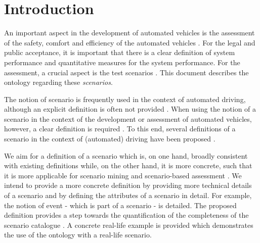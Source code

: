\section{Introduction}
\label{sec:introduction}

An important aspect in the development of automated vehicles is the assessment of the safety, comfort and efficiency of the automated vehicles \cite{bengler2014threedecades, stellet2015taxonomy, Helmer2017safety, putz2017pegasus, roesener2017comprehensive, gietelink2006development}. For the legal and public acceptance, it is important that there is a clear definition of system performance and quantitative measures for the system performance. For the assessment, a crucial aspect is the test scenarios \cite{stellet2015taxonomy}. This document describes the ontology regarding these \emph{scenarios}.

The notion of scenario is frequently used in the context of automated driving, although an explicit definition is often not provided \cite{putz2017pegasus, roesener2017comprehensive, gietelink2006development, hulshof2013autonomous, karaduman2013interactivebehavior, englund2016grand, xu2002effects, ebner2011identifying, ploeg2017GCDC, zofka2015datadrivetrafficscenarios}. When using the notion of a scenario in the context of the development or assessment of automated vehicles, however, a clear definition is required \cite{stellet2015taxonomy, Helmer2017safety, alvarez2017prospective, zofka2015datadrivetrafficscenarios, aparicio2013pre, lesemann2011test, putz2017pegasus, geyer2014, ulbrich2015}. To this end, several definitions of a scenario in the context of (automated) driving have been proposed \cite{geyer2014, ulbrich2015, elrofai2016scenario}.

We aim for a definition of a scenario which is, on one hand, broadly consistent with existing definitions \cite{geyer2014, ulbrich2015, elrofai2016scenario} while, on the other hand, it is more concrete, such that it is more applicable for scenario mining \cite{elrofai2016scenario} and scenario-based assessment \cite{stellet2015taxonomy, deGelder2017assessment}. We intend to provide a more concrete definition by providing more technical details of a scenario and by defining the attributes of a scenario in detail. For example, the notion of event - which is part of a scenario - is detailed. The proposed definition provides a step towards the quantification of the completeness of the scenario catalogue \cite{geyer2014, alvarez2017prospective, stellet2015taxonomy}. A concrete real-life example is provided which demonstrates the use of the ontology with a real-life scenario.

